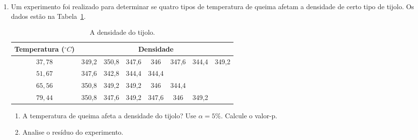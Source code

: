 \documentclass[11pt, a4paper]{article}
\begin{document}
\begin{enumerate}
	\item Um experimento foi realizado para determinar se quatro tipos de temperatura de queima afetam a densidade de certo tipo de tijolo. Os dados estão na Tabela~\ref{tab:densidade-tijolo}.
	\begin{table}[hbtp]
		\centering
		\begin{tabular}{c|ccccccc}
			\toprule[0.05cm]
			Temperatura ($^\circ C$) & \multicolumn{7}{|c}{Densidade} \\
			\midrule[0.025cm]
			$37,78$ & 349,2 & 350,8 & 347,6 & 346 & 347,6 & 344,4 & 349,2\\
			$51,67$ & 347,6 & 342,8 & 344,4 & 344,4 &   &   &  \\
			$65,56$ & 350,8 & 349,2 & 349,2 & 346 & 344,4 &   &  \\
			$79,44$ & 350,8 & 347,6 & 349,2 & 347,6 & 346 & 349,2 &  \\ \bottomrule[0.05cm]
		\end{tabular}
		\caption{A densidade do tijolo.}
		\label{tab:densidade-tijolo}
	\end{table}
	\begin{enumerate}
		\item A temperatura de queima afeta a densidade do tijolo? Use $\alpha=5\%$. Calcule o valor-p.
		\item Analise o resíduo do experimento.
	\end{enumerate}


\end{enumerate}
\end{document}
